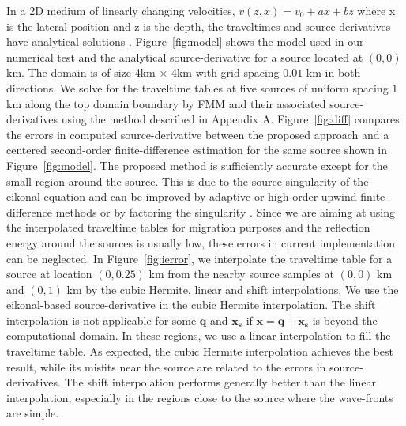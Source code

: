 In a 2D medium of linearly changing velocities, $v(z,x) = v_0 + a x + b z$ where x is the 
lateral position and z is the depth, the traveltimes and source-derivatives have analytical 
solutions \cite[]{slotnick}. Figure~\ref{fig:model} shows the model used in our numerical test 
and the analytical source-derivative for a source located at $(0,0)$ km. The domain is of 
size 4km $\times$ 4km with grid spacing $0.01$ km in both directions. We solve for the traveltime 
tables at five sources of uniform spacing $1$ km along the top domain boundary by FMM and 
their associated source-derivatives using the method described in Appendix A. Figure~\ref{fig:diff} 
compares the errors in computed source-derivative between the proposed approach and a centered 
second-order finite-difference estimation for the same source shown in Figure~\ref{fig:model}. 
The proposed method is sufficiently accurate except for the small region around the source. This 
is due to the source singularity of the eikonal equation and can be improved by adaptive or 
high-order upwind finite-difference methods \cite[]{qian} or by factoring the singularity 
\cite[]{fomel4}. Since we are aiming at using the interpolated traveltime tables for migration 
purposes and the reflection energy around the sources is usually low, these errors in current 
implementation can be neglected. In Figure~\ref{fig:ierror}, we interpolate the traveltime 
table for a source at location $(0,0.25)$ km from the nearby source samples at $(0,0)$ km and 
$(0,1)$ km by the cubic Hermite, linear and shift interpolations. We use the eikonal-based 
source-derivative in the cubic Hermite interpolation. The shift interpolation is not applicable 
for some $\mathbf{q}$ and $\mathbf{x_s}$ if $\mathbf{x = q+x_s}$ is beyond the computational 
domain. In these regions, we use a linear interpolation to fill the traveltime table. As expected, 
the cubic Hermite interpolation achieves the best result, while its misfits near the source 
are related to the errors in source-derivatives. The shift interpolation performs generally 
better than the linear interpolation, especially in the regions close to the source where the 
wave-fronts are simple.


